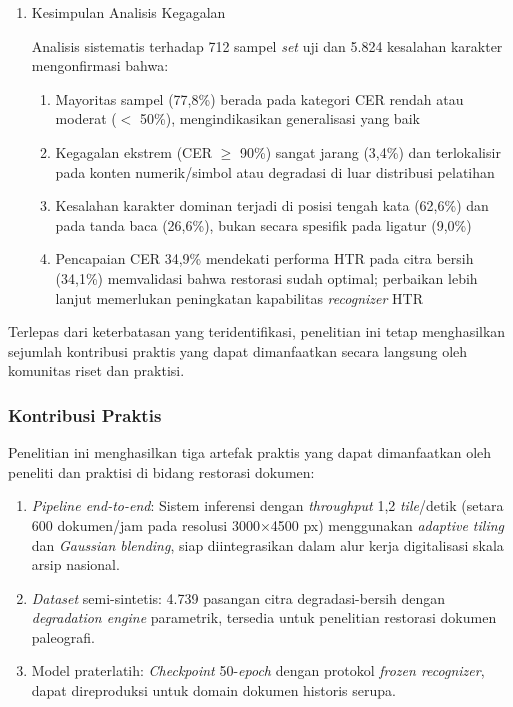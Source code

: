 \documentclass[12pt,a4paper]{article}
\begin{document}
\begin{enumerate}[leftmargin=1.5em, labelsep=0.5em, itemindent=0pt, label=\arabic*., topsep=0pt, partopsep=0pt]
\item Kesimpulan Analisis Kegagalan

Analisis sistematis terhadap 712 sampel \textit{set} uji dan 5.824 kesalahan karakter mengonfirmasi bahwa:
\begin{enumerate}[leftmargin=1.5em, labelsep=0.5em, itemindent=0pt, noitemsep, topsep=0pt, label=\alph*)]
    \item Mayoritas sampel (77,8\%) berada pada kategori CER rendah atau moderat ($<$ 50\%), mengindikasikan generalisasi yang baik
    \item Kegagalan ekstrem (CER $\geq$ 90\%) sangat jarang (3,4\%) dan terlokalisir pada konten numerik/simbol atau degradasi di luar distribusi pelatihan
    \item Kesalahan karakter dominan terjadi di posisi tengah kata (62,6\%) dan pada tanda baca (26,6\%), bukan secara spesifik pada ligatur (9,0\%)
    \item Pencapaian CER 34,9\% mendekati performa HTR pada citra bersih (34,1\%) memvalidasi bahwa restorasi sudah optimal; perbaikan lebih lanjut memerlukan peningkatan kapabilitas \textit{recognizer} HTR
\end{enumerate}
\end{enumerate}

Terlepas dari keterbatasan yang teridentifikasi, penelitian ini tetap menghasilkan sejumlah kontribusi praktis yang dapat dimanfaatkan secara langsung oleh komunitas riset dan praktisi.

\subsubsection{Kontribusi Praktis}
\label{subsubsec:kontribusi-praktis}

Penelitian ini menghasilkan tiga artefak praktis yang dapat dimanfaatkan oleh peneliti dan praktisi di bidang restorasi dokumen:
\begin{enumerate}[leftmargin=1.5em, labelsep=0.5em, itemindent=0pt, noitemsep, topsep=0pt, partopsep=0pt, label=\alph*)]
    \item \textit{Pipeline end-to-end}: Sistem inferensi dengan \textit{throughput} 1,2 \textit{tile}/detik (setara 600 dokumen/jam pada resolusi 3000×4500 px) menggunakan \textit{adaptive tiling} dan \textit{Gaussian blending}, siap diintegrasikan dalam alur kerja digitalisasi skala arsip nasional.
    \item \textit{Dataset} semi-sintetis: 4.739 pasangan citra degradasi-bersih dengan \textit{degradation engine} parametrik, tersedia untuk penelitian restorasi dokumen paleografi.
    \item Model praterlatih: \textit{Checkpoint} 50-\textit{epoch} dengan protokol \textit{frozen recognizer}, dapat direproduksi untuk domain dokumen historis serupa.
\end{enumerate}



\end{document}
